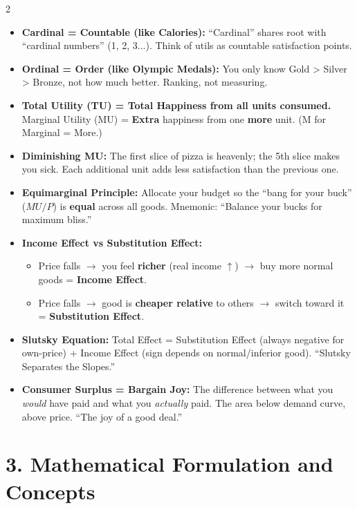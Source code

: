 \documentclass[10pt,a4paper]{article}
\begin{document}
\begin{multicols}{2}
\begin{itemize}[leftmargin=*,nosep]
    \item \textbf{Cardinal = Countable (like Calories):} ``Cardinal'' shares root with ``cardinal numbers'' (1, 2, 3...). Think of utils as countable satisfaction points.
    \item \textbf{Ordinal = Order (like Olympic Medals):} You only know Gold > Silver > Bronze, not how much better. Ranking, not measuring.
    \item \textbf{Total Utility (TU) = Total Happiness from all units consumed.} Marginal Utility (MU) = \textbf{Extra} happiness from one \textbf{more} unit. (M for Marginal = More.)
    \item \textbf{Diminishing MU:} The first slice of pizza is heavenly; the 5th slice makes you sick. Each additional unit adds less satisfaction than the previous one.
    \item \textbf{Equimarginal Principle:} Allocate your budget so the ``bang for your buck'' ($MU/P$) is \textbf{equal} across all goods. Mnemonic: ``Balance your bucks for maximum bliss.''
    \item \textbf{Income Effect vs Substitution Effect:}
    \begin{itemize}[nosep]
        \item Price falls $\to$ you feel \textbf{richer} (real income $\uparrow$) $\to$ buy more normal goods = \textbf{Income Effect}.
        \item Price falls $\to$ good is \textbf{cheaper relative} to others $\to$ switch toward it = \textbf{Substitution Effect}.
    \end{itemize}
    \item \textbf{Slutsky Equation:} Total Effect = Substitution Effect (always negative for own-price) + Income Effect (sign depends on normal/inferior good). ``Slutsky Separates the Slopes.''
    \item \textbf{Consumer Surplus = Bargain Joy:} The difference between what you \textit{would} have paid and what you \textit{actually} paid. The area below demand curve, above price. ``The joy of a good deal.''
\end{itemize}

\section*{3. Mathematical Formulation and Concepts}


\end{multicols}
\end{document}
